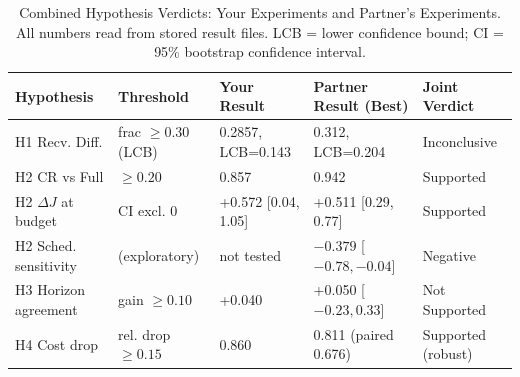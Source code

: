 \begin{table}[ht]
\centering
\small
\caption{Combined Hypothesis Verdicts: Your Experiments and Partner's Experiments.
All numbers read from stored result files.
LCB = lower confidence bound; CI = 95\% bootstrap confidence interval.}
\label{tab:hypothesis_combined}
\begin{tabular}{lllll}
\toprule
\textbf{Hypothesis} & \textbf{Threshold} & \textbf{Your Result} & \textbf{Partner Result (Best)} & \textbf{Joint Verdict} \\
\midrule
H1 Recv. Diff. & frac $\geq 0.30$ (LCB) & 0.2857, LCB=0.143 & 0.312, LCB=0.204 & Inconclusive \\
H2 CR vs Full & $\geq 0.20$ & 0.857 & 0.942 & Supported \\
H2 $\Delta J$ at budget & CI excl. 0 & +0.572 [0.04, 1.05] & +0.511 [0.29, 0.77] & Supported \\
H2 Sched. sensitivity & (exploratory) & not tested & $-0.379$ [$-0.78, -0.04$] & Negative \\
H3 Horizon agreement & gain $\geq 0.10$ & +0.040 & +0.050 [$-0.23, 0.33$] & Not Supported \\
H4 Cost drop & rel. drop $\geq 0.15$ & 0.860 & 0.811 (paired 0.676) & Supported (robust) \\
\bottomrule
\end{tabular}
\end{table}
